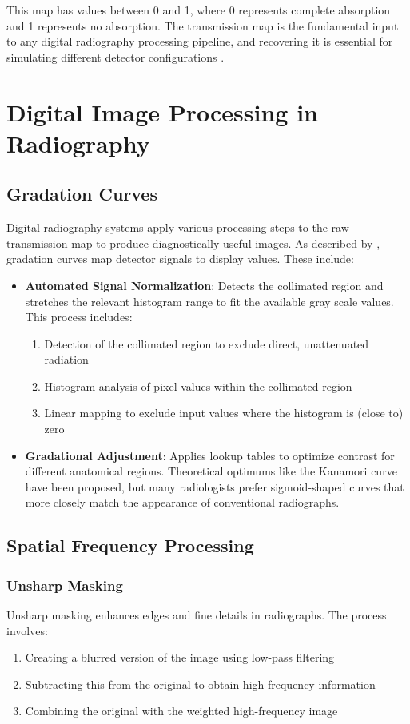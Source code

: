 \documentclass[nomenclature, english, bibtex]{kththesis}
\numberwithin{listing}{chapter}
\begin{document}
This map has values between 0 and 1, where 0 represents complete absorption and 1 represents no absorption. The transmission map is the fundamental input to any digital radiography processing pipeline, and recovering it is essential for simulating different detector configurations \cite{seibert2006flat}.

\section{Digital Image Processing in Radiography}
\subsection{Gradation Curves}
Digital radiography systems apply various processing steps to the raw transmission map to produce diagnostically useful images. As described by \cite{prokop2003principles}, gradation curves map detector signals to display values. These include:

\begin{itemize}
    \item \textbf{Automated Signal Normalization}: Detects the collimated region and stretches the relevant histogram range to fit the available gray scale values. This process includes:
    \begin{enumerate}
        \item Detection of the collimated region to exclude direct, unattenuated radiation
        \item Histogram analysis of pixel values within the collimated region
        \item Linear mapping to exclude input values where the histogram is (close to) zero
    \end{enumerate}
    
    \item \textbf{Gradational Adjustment}: Applies lookup tables to optimize contrast for different anatomical regions. Theoretical optimums like the Kanamori curve \cite{kanamori1966determination} have been proposed, but many radiologists prefer sigmoid-shaped curves that more closely match the appearance of conventional radiographs.
\end{itemize}

\subsection{Spatial Frequency Processing}
\subsubsection{Unsharp Masking}
Unsharp masking enhances edges and fine details in radiographs. The process involves:
\begin{enumerate}
    \item Creating a blurred version of the image using low-pass filtering
    \item Subtracting this from the original to obtain high-frequency information
    \item Combining the original with the weighted high-frequency image
\end{enumerate}
\end{document}
